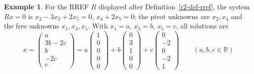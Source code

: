 \documentclass[12pt]{article}
\newcommand{\R}{\mathbb R}
\theoremstyle{definition}
\newtheorem{example}[theorem]{Example}
\begin{document}
\begin{example}\label{r2-exm-read}
For the RREF \(R\) displayed after Definition~\ref{r2-def-rref}, the system \(Rx=0\) is
\(x_2-3x_3+2x_5=0\), \(x_4+2x_5=0\); the pivot unknowns are \(x_2,x_4\) and the free
unknowns \(x_1,x_3,x_5\). With \(x_1=a\), \(x_3=b\), \(x_5=c\), all solutions are
\[
x=\begin{pmatrix}a\\3b-2c\\b\\-2c\\c\end{pmatrix}
=a\begin{pmatrix}1\\0\\0\\0\\0\end{pmatrix}+b\begin{pmatrix}0\\3\\1\\0\\0\end{pmatrix}+c\begin{pmatrix}0\\-2\\0\\-2\\1\end{pmatrix}
\qquad(a,b,c\in\R)
\]
\end{example}
\end{document}
